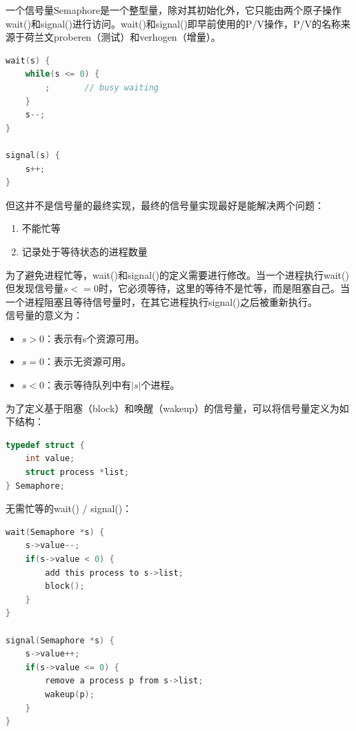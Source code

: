 一个信号量Semaphore是一个整型量，除对其初始化外，它只能由两个原子操作wait()和signal()进行访问。wait()和signal()即早前使用的P/V操作，P/V的名称来源于荷兰文proberen（测试）和verhogen（增量）。

\vspace{-0.5cm}

\begin{lstlisting}[language=C]
wait(s) {
	while(s <= 0) {
		;		// busy waiting
	}
	s--;
}

signal(s) {
	s++;
}
\end{lstlisting}

但这并不是信号量的最终实现，最终的信号量实现最好是能解决两个问题：

\begin{enumerate}
    \item 不能忙等
    \item 记录处于等待状态的进程数量
\end{enumerate}

为了避免进程忙等，wait()和signal()的定义需要进行修改。当一个进程执行wait()但发现信号量$ s <= 0 $时，它必须等待，这里的等待不是忙等，而是阻塞自己。当一个进程阻塞且等待信号量时，在其它进程执行signal()之后被重新执行。\\

信号量的意义为：

\begin{itemize}
    \item $ s > 0 $：表示有s个资源可用。
    \item $ s = 0 $：表示无资源可用。
    \item $ s < 0 $：表示等待队列中有$ |s| $个进程。
\end{itemize}

为了定义基于阻塞（block）和唤醒（wakeup）的信号量，可以将信号量定义为如下结构：

\vspace{-0.5cm}

\begin{lstlisting}[language=C]
typedef struct {
	int value;
	struct process *list;
} Semaphore;
\end{lstlisting}

无需忙等的wait() / signal()：

\vspace{-0.5cm}

\begin{lstlisting}[language=C]
wait(Semaphore *s) {
	s->value--;
	if(s->value < 0) {
		add this process to s->list;
		block();
	}
}

signal(Semaphore *s) {
	s->value++;
	if(s->value <= 0) {
		remove a process p from s->list;
		wakeup(p);
	}
}
\end{lstlisting}

